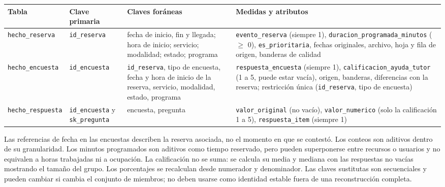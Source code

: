 \documentclass[11pt,letterpaper]{article}
\begin{document}
\begingroup\small\setlength{\tabcolsep}{4pt}\renewcommand{\arraystretch}{1.15}
\begin{longtable}{>{\raggedright\arraybackslash}p{}>{\raggedright\arraybackslash}p{}>{\raggedright\arraybackslash}p{}>{\raggedright\arraybackslash}p{}}
\toprule
\textbf{Tabla} & \textbf{Clave primaria} & \textbf{Claves foráneas} & \textbf{Medidas y atributos} \\
\midrule
\endhead
\texttt{hecho\_\allowbreak{}reserva} & \texttt{id\_\allowbreak{}reserva} & fecha de inicio, fin y llegada; hora de inicio; servicio; modalidad; estado; programa & \texttt{evento\_\allowbreak{}reserva} (siempre 1), \texttt{duracion\_\allowbreak{}programada\_\allowbreak{}minutos} ($\geq$ 0), \texttt{es\_\allowbreak{}prioritaria}, fechas originales, archivo, hoja y fila de origen, banderas de calidad \\
\texttt{hecho\_\allowbreak{}encuesta} & \texttt{id\_\allowbreak{}encuesta} & \texttt{id\_\allowbreak{}reserva}, tipo de encuesta, fecha y hora de inicio de la reserva, servicio, modalidad, estado, programa & \texttt{respuesta\_\allowbreak{}encuesta} (siempre 1), \texttt{calificacion\_\allowbreak{}ayuda\_\allowbreak{}tutor} (1 a 5, puede estar vacía), origen, banderas, diferencias con la reserva; restricción única (\texttt{id\_\allowbreak{}reserva}, tipo de encuesta) \\
\texttt{hecho\_\allowbreak{}respuesta} & \texttt{id\_\allowbreak{}encuesta} y \texttt{sk\_\allowbreak{}pregunta} & encuesta, pregunta & \texttt{valor\_\allowbreak{}original} (no vacío), \texttt{valor\_\allowbreak{}numerico} (solo la calificación 1 a 5), \texttt{respuesta\_\allowbreak{}item} (siempre 1) \\
\bottomrule
\end{longtable}
\endgroup


Las referencias de fecha en las encuestas describen la reserva asociada, no el momento en que se contestó. Los conteos son aditivos dentro de su granularidad. Los minutos programados son aditivos como tiempo reservado, pero pueden superponerse entre recursos o usuarios y no equivalen a horas trabajadas ni a ocupación. La calificación no se suma: se calcula su media y mediana con las respuestas no vacías mostrando el tamaño del grupo. Los porcentajes se recalculan desde numerador y denominador. Las claves sustitutas son secuenciales y pueden cambiar si cambia el conjunto de miembros; no deben usarse como identidad estable fuera de una reconstrucción completa.
\end{document}
